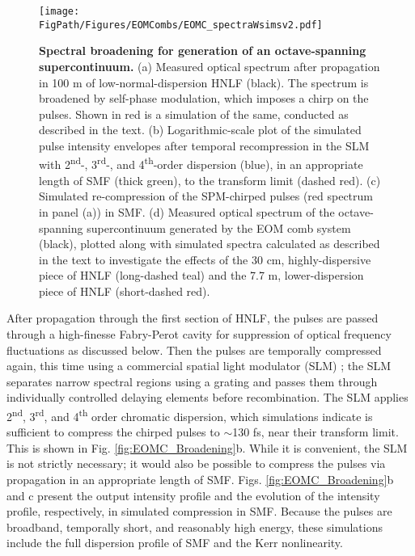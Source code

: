 \begin{figure}[htpb]
	\begin{center}
		\texttt{[image: \\FigPath/Figures/EOMCombs/EOMC\_spectraWsimsv2.pdf]}
	\end{center}
	\caption[Figure Title]{\textbf{Spectral broadening for generation of an octave-spanning supercontinuum.} (a) Measured optical spectrum after propagation in 100 m of low-normal-dispersion HNLF (black). The spectrum is broadened by self-phase modulation, which imposes a chirp on the pulses. Shown in red is a simulation of the same, conducted as described in the text. (b) Logarithmic-scale plot of the simulated pulse intensity envelopes after temporal recompression in the SLM with 2\textsuperscript{nd}-, 3\textsuperscript{rd}-, and 4\textsuperscript{th}-order dispersion (blue), in an appropriate length of SMF (thick green), to the transform limit (dashed red). (c) Simulated re-compression of the SPM-chirped pulses (red spectrum in panel (a)) in SMF. (d) Measured optical spectrum of the octave-spanning supercontinuum generated by the EOM comb system (black), plotted along with simulated spectra calculated as described in the text to investigate the effects of the 30 cm, highly-dispersive piece of HNLF (long-dashed teal) and the 7.7 m, lower-dispersion piece of HNLF (short-dashed red).}
\end{figure} 

After propagation through the first section of HNLF, the pulses are passed through a high-finesse Fabry-Perot cavity for suppression of optical frequency fluctuations as discussed below. Then the pulses are temporally compressed again, this time using a commercial spatial light modulator (SLM) \cite{Weiner2000}; the SLM separates narrow spectral regions using a grating and passes them through individually controlled delaying elements before recombination. The SLM applies 2\textsuperscript{nd}, 3\textsuperscript{rd}, and 4\textsuperscript{th} order chromatic dispersion, which simulations indicate is sufficient to compress the chirped pulses to $\sim$130 fs, near their transform limit. This is shown in Fig. \ref{fig:EOMC_Broadening}b. While it is convenient, the SLM is not strictly necessary; it would also be possible to compress the pulses via propagation in an appropriate length of SMF. Figs. \ref{fig:EOMC_Broadening}b and c present the output intensity profile and the evolution of the intensity profile, respectively, in simulated compression in SMF. Because the pulses are broadband, temporally short, and reasonably high energy, these simulations include the full dispersion profile of SMF and the Kerr nonlinearity.



